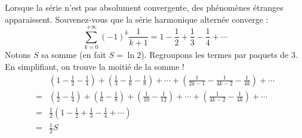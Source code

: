 \begin{frame}
\begin{miniexercice}
Lorsque la série n'est pas absolument convergente,
des phénomènes étranges apparaissent.
Souvenez-vous que la série harmonique alternée converge :
$$\sum_{k=0}^{+\infty} (-1)^{k} \frac{1}{k+1} 
= 1-\frac{1}{2}+\frac{1}{3}-\frac{1}{4} +\cdots $$
Notons $S$ sa somme (en fait $S = \ln 2$). Regroupons les termes par paquets de $3$. En simplifiant, on trouve la moitié de la somme !
\begin{align*}
& \left(1-\tfrac{1}{2}-\tfrac{1}{4} \right)+
  \left(\tfrac{1}{3}-\tfrac{1}{6}-\tfrac{1}{8} \right)+\cdots+ 
  \left(\tfrac{1}{2k-1}-\tfrac{1}{4k-2}-\tfrac{1}{4k} \right)+\cdots   \\
= &  \left(\tfrac{1}{2}-\tfrac{1}{4} \right)+
  \left(\tfrac{1}{6}-\tfrac{1}{8} \right)+
  \left(\tfrac{1}{10}-\tfrac{1}{12} \right)+\cdots+ 
  \left(\tfrac{1}{4k-2}-\tfrac{1}{4k} \right)+\cdots   \\ 
= & \tfrac12  \left( 1-\tfrac{1}{2}+\tfrac{1}{3}-\tfrac{1}{4} + \cdots \right) \\
= & \tfrac12 S
\end{align*}
\end{miniexercice}
\end{frame}

